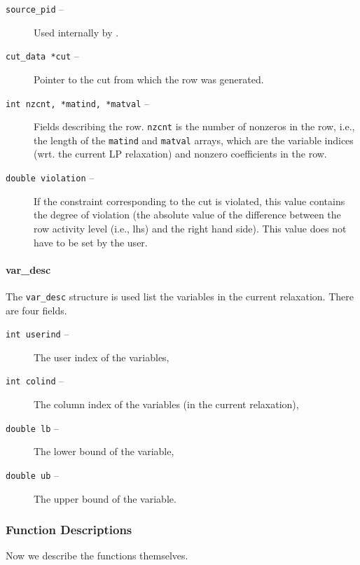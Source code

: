 \begin{description}
\begin{description}

\item[{\tt source\_pid} --] Used internally by \BB.

\item[{\tt cut\_data *cut} --] Pointer to the cut from which the row was generated.

\item[{\tt int nzcnt, *matind, *matval} --] Fields describing the row. {\tt nzcnt} is the number of nonzeros in
the row, i.e., the length of the {\tt matind} and {\tt matval} arrays,
which are the variable indices (wrt. the current LP relaxation) and
nonzero coefficients in the row.

\item[{\tt double violation} --] If the constraint corresponding to the cut is violated, this value
contains the degree of violation (the absolute value of the difference
between the row activity level (i.e., lhs) and the right hand
side). This value does not have to be set by the user.

\end{description}

\begin{htmlonly}
\paragraph{var\_desc}
\end{htmlonly}

The {\tt var\_desc} structure is used list the variables in the current
relaxation. There are four fields.

\begin{description}
\item[{\tt int userind} --] The user index of the variables,
\item[{\tt int colind} --] The column index of the variables (in the
current relaxation),
\item[{\tt double lb} --] The lower bound of the variable,
\item[{\tt double ub} --] The upper bound of the variable.
\end{description}

\end{description}

\newpage
\subsubsection{Function Descriptions}
\noindent Now we describe the functions themselves.


